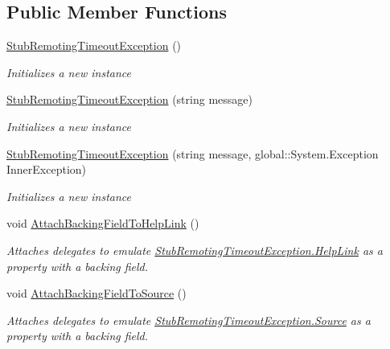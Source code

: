 \subsection*{Public Member Functions}
\begin{DoxyCompactItemize}
\item 
\hyperlink{class_system_1_1_runtime_1_1_remoting_1_1_fakes_1_1_stub_remoting_timeout_exception_a2d7d1e37640445f60bee455d72ad5ca5}{Stub\-Remoting\-Timeout\-Exception} ()
\begin{DoxyCompactList}\small\item\em Initializes a new instance\end{DoxyCompactList}\item 
\hyperlink{class_system_1_1_runtime_1_1_remoting_1_1_fakes_1_1_stub_remoting_timeout_exception_ac05a66031486c352803903bc66833ff9}{Stub\-Remoting\-Timeout\-Exception} (string message)
\begin{DoxyCompactList}\small\item\em Initializes a new instance\end{DoxyCompactList}\item 
\hyperlink{class_system_1_1_runtime_1_1_remoting_1_1_fakes_1_1_stub_remoting_timeout_exception_a3679a5b1a00603923d5813e2d152f07e}{Stub\-Remoting\-Timeout\-Exception} (string message, global\-::\-System.\-Exception Inner\-Exception)
\begin{DoxyCompactList}\small\item\em Initializes a new instance\end{DoxyCompactList}\item 
void \hyperlink{class_system_1_1_runtime_1_1_remoting_1_1_fakes_1_1_stub_remoting_timeout_exception_aa57e551f0be97775b87f17cbb532cc74}{Attach\-Backing\-Field\-To\-Help\-Link} ()
\begin{DoxyCompactList}\small\item\em Attaches delegates to emulate \hyperlink{class_system_1_1_runtime_1_1_remoting_1_1_fakes_1_1_stub_remoting_timeout_exception_a042c5409aec2421855d2c7b6ea7c8f56}{Stub\-Remoting\-Timeout\-Exception.\-Help\-Link} as a property with a backing field.\end{DoxyCompactList}\item 
void \hyperlink{class_system_1_1_runtime_1_1_remoting_1_1_fakes_1_1_stub_remoting_timeout_exception_a2573e8b55b7e9181759148d0398f6d0a}{Attach\-Backing\-Field\-To\-Source} ()
\begin{DoxyCompactList}\small\item\em Attaches delegates to emulate \hyperlink{class_system_1_1_runtime_1_1_remoting_1_1_fakes_1_1_stub_remoting_timeout_exception_a5cd257e96f4f893410f67e610e43f48d}{Stub\-Remoting\-Timeout\-Exception.\-Source} as a property with a backing field.\end{DoxyCompactList}\item 

\end{DoxyCompactItemize}
